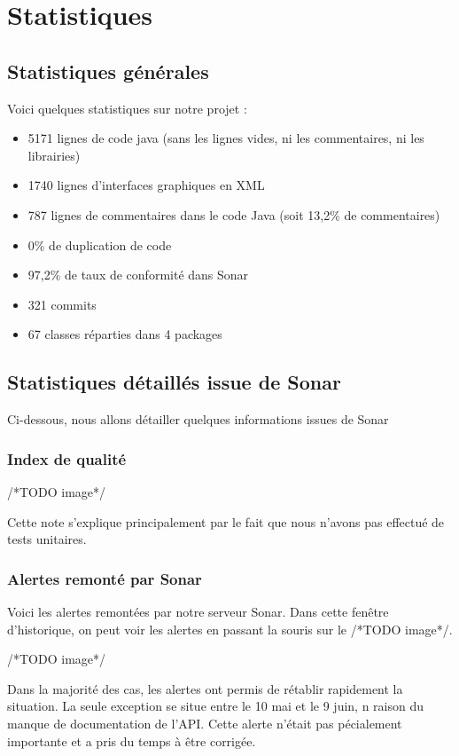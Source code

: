 \documentclass{report}
\begin{document}
\section{Statistiques}

\subsection{Statistiques générales}

Voici quelques statistiques sur notre projet :
\begin{itemize}
\item 5171 lignes de code java (sans les lignes vides, ni les
commentaires, ni les librairies)
\item 1740 lignes d’interfaces graphiques en XML
\item 787 lignes de commentaires dans le code Java (soit 13,2\% de
commentaires)
\item 0\% de duplication de code
\item 97,2\% de taux de conformité dans Sonar
\item 321 commits
\item 67 classes réparties dans 4 packages
\end{itemize}

\subsection{Statistiques détaillés issue de Sonar}

Ci-dessous, nous allons détailler quelques informations issues de Sonar

\subsubsection{Index de qualité}

/*TODO image*/

Cette note s’explique principalement par le fait que nous n’avons pas
effectué de tests unitaires.

\subsubsection{Alertes remonté par Sonar}

Voici les alertes remontées par notre serveur Sonar. Dans cette fenêtre
d’historique, on peut voir les alertes en passant la souris sur le
/*TODO image*/.

/*TODO image*/

Dans la majorité des cas, les alertes ont permis de rétablir rapidement
la situation. La seule exception se situe entre le 10 mai et le 9 juin,
n raison du manque de documentation de l’API. Cette alerte n’était pas
pécialement importante et a pris du temps à être corrigée.
\end{document}
